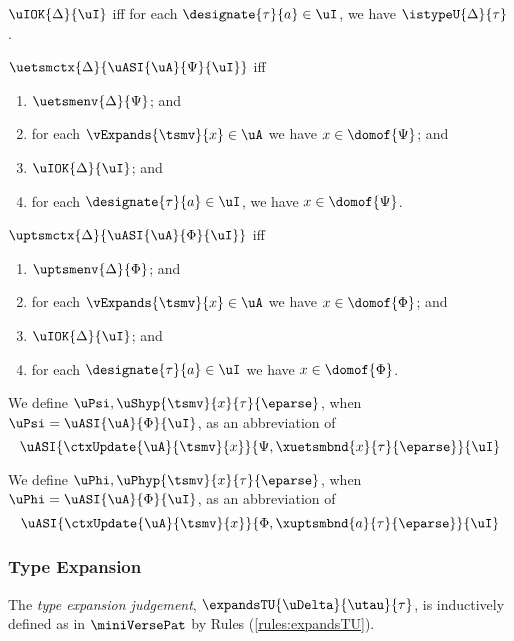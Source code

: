 \begin{definition}\label{def:implicit-designation-ctx-formation-S} $\uIOK{\Delta}{\uI}$ iff for each $\designate{\tau}{a} \in \uI$, we have $\istypeU{\Delta}{\tau}$.
\end{definition}

\begin{definition} $\uetsmctx{\Delta}{\uASI{\uA}{\Psi}{\uI}}$ iff
\begin{enumerate}
\item $\uetsmenv{\Delta}{\Psi}$; and
\item for each $\vExpands{\tsmv}{x} \in \uA$ we have $x \in \domof{\Psi}$; and
\item $\uIOK{\Delta}{\uI}$; and
\item for each $\designate{\tau}{a} \in \uI$, we have $x \in \domof{\Psi}$.
\end{enumerate}
\end{definition}

\begin{definition} $\uptsmctx{\Delta}{\uASI{\uA}{\Phi}{\uI}}$ iff 
\begin{enumerate}
\item $\uptsmenv{\Delta}{\Phi}$; and
\item for each $\vExpands{\tsmv}{x} \in \uA$ we have $x \in \domof{\Phi}$; and
\item $\uIOK{\Delta}{\uI}$; and
\item for each $\designate{\tau}{a} \in \uI$ we have $x \in \domof{\Phi}$.
\end{enumerate}
\end{definition}

We define $\uPsi, \uShyp{\tsmv}{x}{\tau}{\eparse}$, when $\uPsi=\uASI{\uA}{\Phi}{\uI}$, as an abbreviation of \[\uASI{\ctxUpdate{\uA}{\tsmv}{x}}{\Psi, \xuetsmbnd{x}{\tau}{\eparse}}{\uI}\]

We define $\uPhi, \uPhyp{\tsmv}{x}{\tau}{\eparse}$, when $\uPhi=\uASI{\uA}{\Phi}{\uI}$, as an abbreviation of \[\uASI{\ctxUpdate{\uA}{\tsmv}{x}}{\Phi, \xuptsmbnd{a}{\tau}{\eparse}}{\uI}\]

\subsubsection{Type Expansion}
The \emph{type expansion judgement}, $\expandsTU{\uDelta}{\utau}{\tau}$, is inductively defined as in $\miniVersePat$ by Rules (\ref{rules:expandsTU}).

